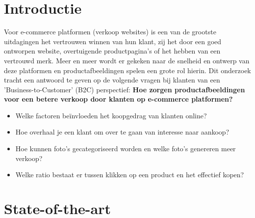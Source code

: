 
\section{Introductie} %
\label{sec:introductie}


Voor e-commerce platformen (verkoop websites) is een van de grootste uitdagingen het vertrouwen winnen van hun klant, zij het door een goed ontworpen website, overtuigende productpagina's of het hebben van een vertrouwd merk. \autocite{Mary2018} Meer en meer wordt er gekeken naar de snelheid en ontwerp van deze platformen en productafbeeldingen spelen een grote rol hierin. Dit onderzoek tracht een antwoord te geven op de volgende vragen bij klanten van een 'Business-to-Customer' (B2C) perspectief: \textbf{Hoe zorgen productafbeeldingen voor een betere verkoop door klanten op e-commerce platformen?}
\begin{itemize}
	\item Welke factoren beïnvloeden het koopgedrag van klanten online?
	\item Hoe overhaal je een klant om over te gaan van interesse naar aankoop?
	\item Hoe kunnen foto's gecategoriseerd worden en welke foto's genereren meer verkoop?
	\item Welke ratio bestaat er tussen klikken op een product en het effectief kopen?
\end{itemize}


\section{State-of-the-art}
\label{sec:state-of-the-art}

